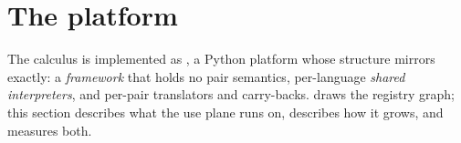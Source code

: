 
\section{The platform}
\label{sec:instantiation}

The calculus is implemented as \hg, a Python platform whose structure
mirrors  exactly: a \emph{framework} that holds no
pair semantics, per-language \emph{shared interpreters}, and per-pair
translators and carry-backs.  draws the registry
graph; this section describes what the use plane runs on,
 describes how it grows, and 
measures both.

